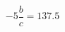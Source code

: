 \documentclass[preview]{standalone}
\begin{document}
\begin{align*}
-5 \dfrac{b}{c}= 137.5
\end{align*}
\end{document}
